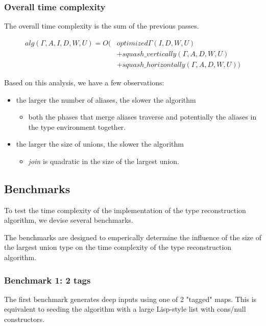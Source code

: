 \subsubsection{Overall time complexity}
\label{overall-time-complexity}
The overall time complexity is the sum of the previous passes.

\begin{align*}
alg(\Gamma,A,I,D,W,U) = O(&optimized\Gamma(I, D, W, U) \\
												  &+ squash\_vertically(\Gamma, A, D, W, U)\\
													&+ squash\_horizontally(\Gamma, A, D, W, U))
\end{align*}

Based on this analysis, we have a few observations:

\begin{itemize}
\item the larger the number of aliases, the slower the algorithm
	\begin{itemize}
		\item both the phases that merge aliases traverse and potentially
					the aliases in the type environment together.
	\end{itemize}
\item the larger the size of unions, the slower the algorithm
	\begin{itemize}
		\item \emph{join} is quadratic in the size of the largest union.
	\end{itemize}
\end{itemize}

\subsection{Benchmarks}

To test the time complexity of the implementation of the type reconstruction
algorithm, we devise several benchmarks.

The benchmarks are designed to emperically determine the influence of the
size of the largest union type on the time complexity of the type reconstruction
algorithm.

\subsubsection{Benchmark 1: 2 tags}

The first benchmark generates deep inputs using one of 2 "tagged" maps.
This is equivalent to seeding the algorithm with
a large Lisp-style list with cons/null constructors.

